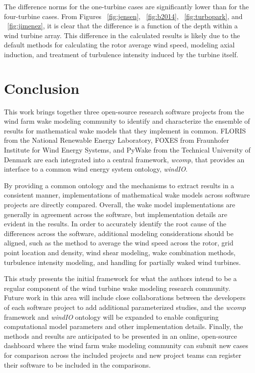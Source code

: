 \documentclass{iopconfser}
\newcommand{\ind}[]{\hspace{6mm}}
\begin{document}
\ind{}The difference norms for the one-turbine cases are significantly lower than for the four-turbine cases.
From Figures ~\ref{fig:jensen}, ~\ref{fig:b2014}, ~\ref{fig:turbopark}, and ~\ref{fig:jimenez}, it is clear that the difference is a function of the depth within a wind turbine array.
This difference in the calculated results is likely due to the default methods for calculating the rotor average wind speed, modeling axial induction, and treatment of turbulence intensity induced by the turbine itself.

\section{Conclusion} \label{conclusion}

This work brings together three open-source research software projects from the wind farm wake modeling community to identify and characterize the ensemble of results for mathematical wake models that they implement in common.
FLORIS from the National Renewable Energy Laboratory, FOXES from Fraunhofer Institute for Wind Energy Systems, and PyWake from the Technical University of Denmark are each integrated into a central framework, \textit{wcomp}, that provides an interface to a common wind energy system ontology, \textit{windIO}.

\ind{}By providing a common ontology and the mechanisms to extract results in a consistent manner, implementations of mathematical wake models across software projects are directly compared.
Overall, the wake model implementations are generally in agreement across the software, but implementation details are evident in the results.
In order to accurately identify the root cause of the differences across the software, additional modeling considerations should be aligned, such as the method to average the wind speed across the rotor, grid point location and density, wind shear modeling, wake combination methods, turbulence intensity modeling, and handling for partially waked wind turbines.

\ind{}This study presents the initial framework for what the authors intend to be a regular component of the wind turbine wake modeling research community.
Future work in this area will include close collaborations between the developers of each software project to add additional parameterized studies, and the \textit{wcomp} framework and \textit{windIO} ontology will be expanded to enable configuring computational model parameters and other implementation details.
Finally, the methods and results are anticipated to be presented in an online, open-source dashboard where the wind farm wake modeling community can submit new cases for comparison across the included projects and new project teams can register their software to be included in the comparisons.
\end{document}
